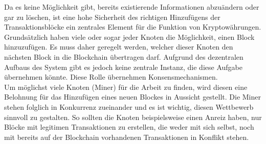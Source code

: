 Da es keine Möglichkeit gibt, bereits existierende Informationen abzuändern oder gar zu löschen, ist eine hohe Sicherheit des richtigen Hinzufügens der Transaktionsblöcke ein zentrales Element für die Funktion von Kryptowährungen. Grundsätzlich haben viele oder sogar jeder Knoten die Möglichkeit, einen Block hinzuzufügen. Es muss daher geregelt werden, welcher dieser Knoten den nächsten Block in die Blockchain übertragen darf. Aufgrund des dezentralen Aufbaus des System gibt es jedoch keine zentrale Instanz, die diese Aufgabe übernehmen könnte. Diese Rolle übernehmen Konsensmechanismen.\\
Um möglichst viele Knoten (Miner) für die Arbeit zu finden, wird diesen eine Belohnung für das Hinzufügen eines neuen Blockes in Aussicht gestellt. Die Miner stehen folglich in Konkurrenz zueinander und es ist wichtig, diesen Wettbewerb sinnvoll zu gestalten. So sollten die Knoten beispielsweise einen Anreiz haben, nur Blöcke mit legitimen Transaktionen zu erstellen, die weder mit sich selbst, noch mit bereits auf der Blockchain vorhandenen Transaktionen in Konflikt stehen.